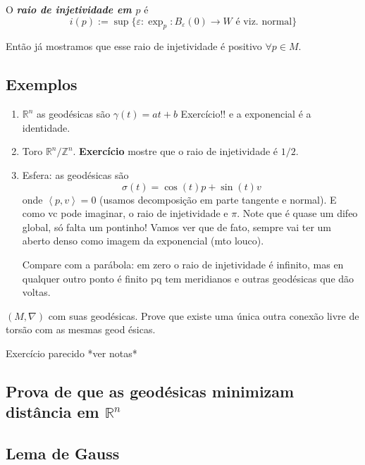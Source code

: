 \begin{defn}\leavevmode
O \textit{\textbf{raio de injetividade em \(p\)}} é
\[i(p):=\operatorname{sup}\{\varepsilon:\operatorname{exp}_p:B_\varepsilon(0) \to W\text{ é viz. normal} \}\]
\end{defn}
Então já mostramos que esse raio de injetividade é positivo \(\forall  p \in M\).

\subsection{Exemplos}

\begin{enumerate}
\item \(\mathbb{R}^n\) as geodésicas são \(\gamma(t)=at+b\) {\color{2}Exercício!!} e a exponencial é a identidade.
\item Toro  \(\mathbb{R}^n/\mathbb{Z}^n\). \textbf{Exercício} mostre que o raio de injetividade é \(1/2\).
\item Esfera: as geodésicas são
	\[\sigma(t)=\cos (t)p+\sin (t)v\]
onde \(\left<p,v\right>=0\) (usamos decomposição em parte tangente e normal). E como vc pode imaginar, o raio de injetividade e \(\pi\). Note que é quase um difeo global, só falta um pontinho! Vamos ver que de fato, sempre vai ter um aberto denso como imagem da exponencial (mto louco).

\begin{remark}\leavevmode
Compare com a parábola: em zero o raio de injetividade é infinito, mas en qualquer outro ponto é finito pq tem meridianos e outras geodésicas que dão voltas.
\end{remark}
\end{enumerate}

\begin{exercise}\leavevmode
\((M,\nabla)\) com suas geodésicas. Prove que existe uma única outra conexão livre de torsão com as mesmas geod ésicas.
\end{exercise}

\begin{thing8}{Exercício parecido}\leavevmode
*ver notas*
\end{thing8}

\subsection{Prova de que as geodésicas minimizam distância em \(\mathbb{R}^n\)}

\subsection{Lema de Gauss}

